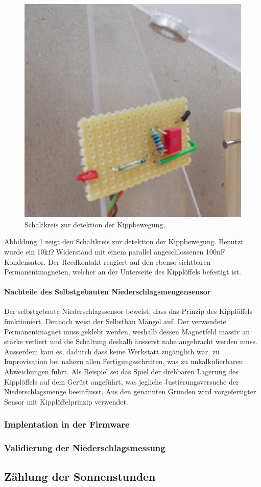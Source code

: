 \begin{figure}[h]
\centering
\includegraphics[width=0.4\linewidth]{graphics/KippSchalt.jpg}
\caption{Schaltkreis zur detektion der Kippbewegung.}
\label{fig:KippSchalt}
\end{figure}

Abbildung \ref{fig:KippSchalt} zeigt den Schaltkreis zur detektion der Kippbewegung. Benutzt wurde ein 10k$\Omega$ Widerstand mit einem parallel angeschlossenen 100nF Kondensator. Der Reedkontakt reagiert auf den ebenso sichtbaren Permanentmagneten, welcher an der Unterseite des Kipplöffels befestigt ist.

\paragraph{Nachteile des Selbstgebauten Niederschlagsmengensensor}
Der selbstgebaute Niederschlagssensor beweist, dass das Prinzip des Kipplöffels funktioniert. Dennoch weist der Selbstbau Mängel auf. Der verwendete Permanentmagnet muss geklebt werden, weshalb dessen Magnetfeld massiv an stärke verliert und die Schaltung deshalb äusserst nahe angebracht werden muss. Ausserdem kam es, dadurch dass keine Werkstatt zugänglich war, zu Improvisation bei nahezu allen Fertigungsschritten, was zu unkalkulierbaren Abweichungen führt. Als Beispiel sei das Spiel der drehbaren Lagerung des Kipplöffels auf dem Gerüst angeführt, was jegliche Justierungsversuche der Niederschlagsmenge beeinflusst. Aus den genannten Gründen wird vorgefertigter Sensor mit Kipplöffelprinzip verwendet.

\subsubsection*{Implentation in der Firmware}
\subsubsection*{Validierung der Niederschlagsmessung}

\newpage

\subsection{Zählung der Sonnenstunden}
